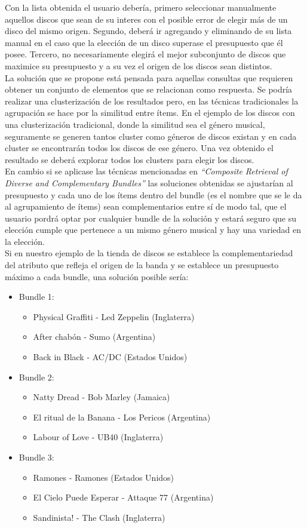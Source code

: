 Con la lista obtenida el usuario debería, primero seleccionar manualmente aquellos discos que sean de su interes con el posible error de elegir más de un disco del mismo origen. Segundo, deberá ir agregando y eliminando de su lista manual en el caso que la elección de un disco superase el presupuesto que él posee. Tercero, no necesariamente elegirá el mejor subconjunto de discos que maximice su presupuesto y a su vez el origen de los discos sean distintos.\\
La solución que se propone está pensada para aquellas consultas que requieren obtener un conjunto de elementos que se relacionan como respuesta. Se podría realizar una clusterización de los resultados pero, en las técnicas tradicionales la agrupación se hace por la similitud entre ítems. En el ejemplo de los discos con una clusterización tradicional, donde la similitud sea el género musical, seguramente se generen tantos cluster como géneros de discos existan y en cada cluster se encontrarán todos los discos de ese género. Una vez obtenido el resultado se deberá explorar todos los clusters para elegir los discos.\\
En cambio si se aplicase las técnicas mencionadas en \textit{``Composite Retrieval of Diverse and Complementary Bundles''} las soluciones obtenidas se ajustarían al presupuesto y cada uno de los ítems dentro del bundle (es el nombre que se le da al agrupamiento de ítems) sean complementarios entre sí de modo tal, que el usuario pordrá optar por cualquier bundle de la solución y estará seguro que su elección cumple que pertenece a un mismo género musical y hay una variedad en la elección.\\
Si en nuestro ejemplo de la tienda de discos se establece la complementariedad del atributo que refleja el origen de la banda y se establece un presupuesto máximo a cada bundle, una solución posible sería:
\begin{itemize}
  \item Bundle 1:
  \begin{itemize}
    \item Physical Graffiti - Led Zeppelin (Inglaterra)
    \item After chabón - Sumo (Argentina)
    \item Back in Black - AC/DC (Estados Unidos)
  \end{itemize}
  \item Bundle 2:
  \begin{itemize}
    \item Natty Dread - Bob Marley (Jamaica)
    \item El ritual de la Banana - Los Pericos (Argentina)
    \item Labour of Love - UB40 (Inglaterra)
  \end{itemize}
	  \item Bundle 3:
  \begin{itemize}
    \item Ramones - Ramones (Estados Unidos)
    \item El Cielo Puede Esperar - Attaque 77 (Argentina)
    \item Sandinista! - The Clash (Inglaterra)
  \end{itemize}
\end{itemize}
